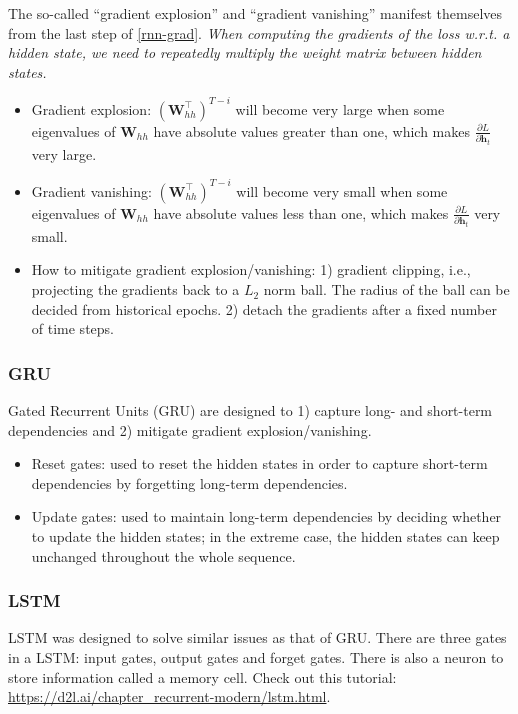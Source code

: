 The so-called ``gradient explosion'' and ``gradient vanishing'' manifest themselves from the last step of \eqref{rnn-grad}.
\emph{When computing the gradients of the loss w.r.t. a hidden state, we need to repeatedly multiply the weight matrix between hidden states.}  
    \begin{itemize}
        \item Gradient explosion: $\left(\bm{W}_{hh}^\top \right)^{T-i}$ will become 
        very large when some eigenvalues of $\bm{W}_{hh}$ have absolute values greater than one, which makes $\frac{\partial L}{\partial \bm{h}_t}$ very large.
        \item Gradient vanishing: $\left(\bm{W}_{hh}^\top \right)^{T-i}$ will become very small when some eigenvalues of $\bm{W}_{hh}$ have absolute values less than one, which makes $\frac{\partial L}{\partial \bm{h}_t}$ very small.
        \item How to mitigate gradient explosion/vanishing: 1) gradient clipping, i.e., projecting the gradients back to a $L_2$ norm ball. 
        The radius of the ball can be decided from historical epochs.
        2) detach the gradients after a fixed number of time steps.
    \end{itemize}
    
\subsubsection{GRU}
    Gated Recurrent Units (GRU) are designed to 1) capture long- and short-term dependencies and 2) mitigate gradient explosion/vanishing.
    \begin{itemize}
        \item Reset gates: used to reset the hidden states in order to capture short-term dependencies by forgetting long-term dependencies.
        \item Update gates: used to maintain long-term dependencies by deciding whether to update the hidden states; in the extreme case, the hidden states can keep unchanged throughout the whole sequence.
    \end{itemize}
    
\subsubsection{LSTM}
    LSTM was designed to solve similar issues as that of GRU.
    There are three gates in a LSTM: input gates, output gates and forget gates. 
    There is also a neuron to store information called a memory cell.
    Check out this tutorial: \url{https://d2l.ai/chapter_recurrent-modern/lstm.html}.
    
